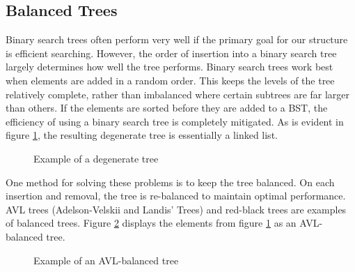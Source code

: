 \subsection*{Balanced Trees}
Binary search trees often perform very well if the primary goal for our structure is efficient searching.
However, the order of insertion into a binary search tree largely determines how well the tree performs.
Binary search trees work best when elements are added in a random order.
This keeps the levels of the tree relatively complete, rather than imbalanced where certain subtrees are far larger than others.
If the elements are sorted before they are added to a BST, the efficiency of using a binary search tree is completely mitigated.
As is evident in figure \ref{fig:Degenerate Tree}, the resulting degenerate tree is essentially a linked list.
\begin{figure}[h]
\centering
{}
\caption{Example of a degenerate tree}
\label{fig:Degenerate Tree}
\end{figure}

One method for solving these problems is to keep the tree balanced.
On each insertion and removal, the tree is re-balanced to maintain optimal performance.
AVL trees (Adelson-Velskii and Landis' Trees) and red-black trees are examples of balanced trees.
Figure \ref{fig:AVL btree} displays the elements from figure \ref{fig:Degenerate Tree} as an AVL-balanced tree.
\begin{figure}[h]
\centering
{}
\caption{Example of an AVL-balanced tree}
\label{fig:AVL btree}
\end{figure}

